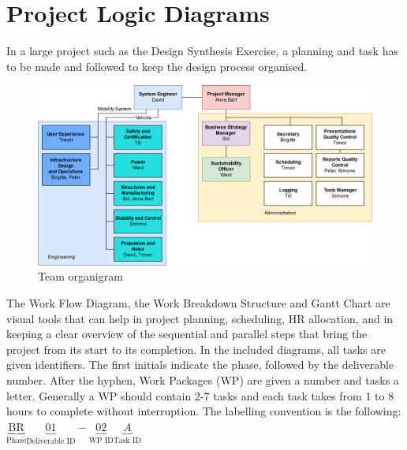 \newpage
\chapter{Project Logic Diagrams}
\label{ch-diagrams}

In a large project such as the Design Synthesis Exercise, a planning and task has to be made and followed to keep the design process organised.


\begin{figure}[h]
    \centering
    \includegraphics[width=0.9\linewidth]{Figures/organigram.png}
    \caption{Team organigram}
    \label{fig:organigram}
\end{figure}


The Work Flow Diagram, the Work Breakdown Structure and Gantt Chart are visual tools that can help in project planning, scheduling, HR allocation, and in keeping a clear overview of the sequential and parallel steps that bring the project from its start to its completion. In the included diagrams, all tasks are given identifiers. The first initials indicate the phase, followed by the deliverable number. After the hyphen, Work Packages (WP) are given a number and tasks a letter. Generally a WP should contain 2-7 tasks and each task takes from 1 to 8 hours to complete without interruption. The labelling convention is the following: $\underbrace{\text{BR}}_\text{Phase}\underbrace{01}_\text{Deliverable ID}-\underbrace{02}_\text{WP ID}\underbrace{A}_\text{Task ID}$ 





